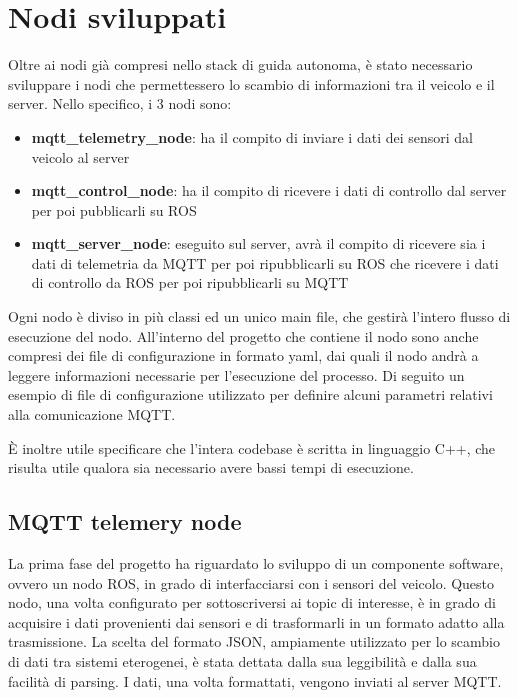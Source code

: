 \section{Nodi sviluppati}
Oltre ai nodi già compresi nello stack di guida autonoma, è stato necessario sviluppare i nodi che permettessero lo scambio di informazioni tra il veicolo e il server. Nello specifico, i 3 nodi sono:
\begin{itemize}
    \item \textbf{mqtt\_telemetry\_node}: ha il compito di inviare i dati dei sensori dal veicolo al server
    \item \textbf{mqtt\_control\_node}: ha il compito di ricevere i dati di controllo dal server per poi pubblicarli su ROS
    \item \textbf{mqtt\_server\_node}: eseguito sul server, avrà il compito di ricevere sia i dati di telemetria da MQTT per poi ripubblicarli su ROS che ricevere i dati di controllo da ROS per poi ripubblicarli su MQTT
\end{itemize}

\noindent Ogni nodo è diviso in più classi ed un unico main file, che gestirà l'intero flusso di esecuzione del nodo. All'interno del progetto che contiene il nodo sono anche compresi dei file di configurazione in formato yaml, dai quali il nodo andrà a leggere informazioni necessarie per l'esecuzione del processo. Di seguito un esempio di file di configurazione utilizzato per definire alcuni parametri relativi alla comunicazione MQTT.



\noindent È inoltre utile specificare che l'intera codebase è scritta in linguaggio C++, che risulta utile qualora sia necessario avere bassi tempi di esecuzione.

\subsection{MQTT telemery node} \label{mqtt_telemetry_node}
La prima fase del progetto ha riguardato lo sviluppo di un componente software, ovvero un nodo ROS, in grado di interfacciarsi con i sensori del veicolo. Questo nodo, una volta configurato per sottoscriversi ai topic di interesse, è in grado di acquisire i dati provenienti dai sensori e di trasformarli in un formato adatto alla trasmissione. La scelta del formato JSON, ampiamente utilizzato per lo scambio di dati tra sistemi eterogenei, è stata dettata dalla sua leggibilità e dalla sua facilità di parsing. I dati, una volta formattati, vengono inviati al server MQTT.

